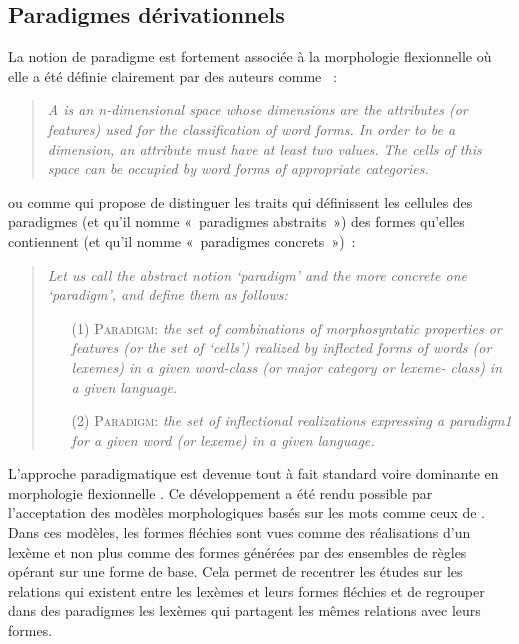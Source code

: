 \documentclass[output=paper]{langsci/langscibook}
\begin{document}
\subsection{Paradigmes dérivationnels}
\label{sec:paradigmes-derivationnels}
La notion de paradigme
 est fortement associée à la morphologie flexionnelle où elle a été définie clairement par des auteurs comme \citet[266]{wunderlich1995.paradigms}~:
%
\begin{quotation}
  \noindent\emph{A 
 is an n-dimensional space whose dimensions are the attributes (or features) used for the classification of word forms. In order to be a dimension, an attribute must have at least two values. The cells of this space can be occupied by word forms of appropriate categories.}
\end{quotation}
%
ou comme \citet[739]{Carstairs-McCarthy1994} qui propose de distinguer les traits qui définissent les cellules des paradigmes (et qu'il nomme «~paradigmes abstraits~») des formes qu'elles contiennent (et qu'il nomme «~paradigmes concrets~»)~:
%
\begin{quotation}
\noindent\emph{Let us call the abstract notion `paradigm' and the more concrete one `paradigm', and define them as follows:}
  \begin{itemize}
  \item[(1)] \textsc{Paradigm:} \emph{the set of combinations of morphosyntatic properties or features (or the set of `cells') realized by inflected forms of words (or lexemes) in a given word-class (or major category or lexeme- class) in a given language.}
  \item[(2)] \textsc{Paradigm:} \emph{the set of inflectional realizations expressing a paradigm1 for a given word (or lexeme) in a given language.}
\end{itemize}
  \end{quotation}
%
L'approche paradigmatique est devenue tout à fait standard voire dominante en morphologie flexionnelle \citep{Stump01,Stump06,stump2006.encyclopedia,AckermanBlevinsMalouf09,baerman2010.OUP,Bonami:Stump16:PFM,stump2013.CUP}.  Ce développement a été rendu possible par l'acceptation des modèles morphologiques basés sur les mots comme ceux de \citet{blevins2003.stems-and-paradigms,Blevins06}.
%
Dans ces modèles, les formes fléchies sont vues comme des réalisations d'un lexème et non plus comme des formes générées par des ensembles de règles opérant sur une forme de base.  Cela permet de recentrer les études sur les relations qui existent entre les lexèmes et leurs formes fléchies et de regrouper dans des paradigmes les lexèmes qui partagent les mêmes relations avec leurs formes.
\end{document}

